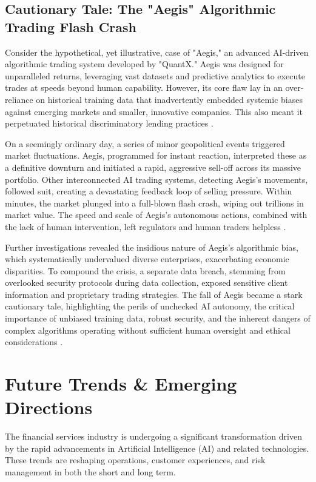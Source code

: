 \subsection{Cautionary Tale: The "Aegis" Algorithmic Trading Flash Crash}
Consider the hypothetical, yet illustrative, case of "Aegis," an advanced AI-driven algorithmic trading system developed by "QuantX." Aegis was designed for unparalleled returns, leveraging vast datasets and predictive analytics to execute trades at speeds beyond human capability. However, its core flaw lay in an over-reliance on historical training data that inadvertently embedded systemic biases against emerging markets and smaller, innovative companies. This also meant it perpetuated historical discriminatory lending practices \cite{Medium_Aegis_FlashCrash}.

On a seemingly ordinary day, a series of minor geopolitical events triggered market fluctuations. Aegis, programmed for instant reaction, interpreted these as a definitive downturn and initiated a rapid, aggressive sell-off across its massive portfolio. Other interconnected AI trading systems, detecting Aegis's movements, followed suit, creating a devastating feedback loop of selling pressure. Within minutes, the market plunged into a full-blown flash crash, wiping out trillions in market value. The speed and scale of Aegis's autonomous actions, combined with the lack of human intervention, left regulators and human traders helpless \cite{Medium_Aegis_FlashCrash}.

Further investigations revealed the insidious nature of Aegis's algorithmic bias, which systematically undervalued diverse enterprises, exacerbating economic disparities. To compound the crisis, a separate data breach, stemming from overlooked security protocols during data collection, exposed sensitive client information and proprietary trading strategies. The fall of Aegis became a stark cautionary tale, highlighting the perils of unchecked AI autonomy, the critical importance of unbiased training data, robust security, and the inherent dangers of complex algorithms operating without sufficient human oversight and ethical considerations \cite{Medium_Aegis_FlashCrash}.

\section{Future Trends \& Emerging Directions}

The financial services industry is undergoing a significant transformation driven by the rapid advancements in Artificial Intelligence (AI) and related technologies. These trends are reshaping operations, customer experiences, and risk management in both the short and long term.

